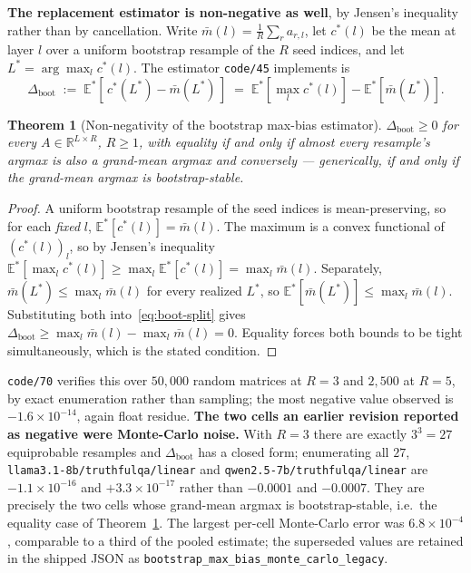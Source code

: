 \documentclass[10pt]{article} %
\newtheorem{theorem}{Theorem}
\begin{document}
\textbf{The replacement estimator is non-negative as well}, by Jensen's
inequality rather than by cancellation. Write $\bar m(l)=\tfrac1R\sum_r
a_{r,l}$, let $c^{*}(l)$ be the mean at layer $l$ over a uniform bootstrap
resample of the $R$ seed indices, and let $L^{*}=\arg\max_l c^{*}(l)$. The
estimator \texttt{code/45} implements is
%
\begin{equation}
\Delta_{\text{boot}}
\;:=\;\mathbb{E}^{*}\!\left[\,c^{*}(L^{*})-\bar m(L^{*})\,\right]
\;=\;\mathbb{E}^{*}\!\left[\max_l c^{*}(l)\right]-\mathbb{E}^{*}\!\left[\bar m(L^{*})\right].
\label{eq:boot-split}
\end{equation}

\begin{theorem}[Non-negativity of the bootstrap max-bias estimator]
\label{thm:boot-nonneg}
$\Delta_{\text{boot}}\ge0$ for every $A\in\mathbb{R}^{L\times R}$, $R\ge1$,
with equality if and only if almost every resample's argmax is also a
grand-mean argmax and conversely --- generically, if and only if the grand-mean
argmax is bootstrap-stable.
\end{theorem}

\begin{proof}
A uniform bootstrap resample of the seed indices is mean-preserving, so for
each \emph{fixed} $l$, $\mathbb{E}^{*}[c^{*}(l)]=\bar m(l)$. The maximum is a
convex functional of $(c^{*}(l))_l$, so by Jensen's inequality
$\mathbb{E}^{*}\!\left[\max_l c^{*}(l)\right]\ge\max_l \mathbb{E}^{*}[c^{*}(l)]
=\max_l \bar m(l)$. Separately, $\bar m(L^{*})\le\max_l \bar m(l)$ for every
realized $L^{*}$, so $\mathbb{E}^{*}[\bar m(L^{*})]\le\max_l \bar m(l)$.
Substituting both into~\eqref{eq:boot-split} gives
$\Delta_{\text{boot}}\ge\max_l\bar m(l)-\max_l\bar m(l)=0$. Equality forces
both bounds to be tight simultaneously, which is the stated condition.
\end{proof}

\noindent \texttt{code/70} verifies this over $50{,}000$ random matrices at
$R=3$ and $2{,}500$ at $R=5$, by exact enumeration rather than sampling; the
most negative value observed is $-1.6\times10^{-14}$, again float residue.
\textbf{The two cells an earlier revision reported as negative were
Monte-Carlo noise.} With $R=3$ there are exactly $3^3=27$ equiprobable
resamples and $\Delta_{\text{boot}}$ has a closed form; enumerating all $27$,
\texttt{llama3.1-8b/truthfulqa/linear} and \texttt{qwen2.5-7b/truthfulqa/linear}
are $-1.1\times10^{-16}$ and $+3.3\times10^{-17}$ rather than $-0.0001$ and
$-0.0007$. They are precisely the two cells whose grand-mean argmax is
bootstrap-stable, i.e.\ the equality case of Theorem~\ref{thm:boot-nonneg}. The
largest per-cell Monte-Carlo error was $6.8\times10^{-4}$, comparable to a
third of the pooled estimate; the superseded values are retained in the shipped
JSON as \texttt{bootstrap\_max\_bias\_monte\_carlo\_legacy}.
\end{document}
